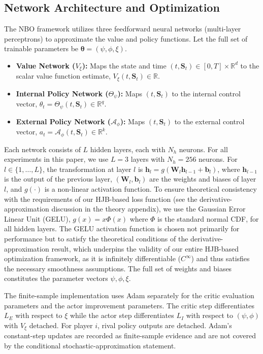 \documentclass[ecta]{econsocart}
\theoremstyle{plain}
\theoremstyle{remark}
\newcommand{\statevec}{\bm{S}}
\newcommand{\paramvec}{\bm{\theta}}
\begin{document}
\subsection{Network Architecture and Optimization}
The NBO framework utilizes three feedforward neural networks (multi-layer perceptrons) to approximate the value and policy functions. Let the full set of trainable parameters be $\paramvec = (\psi, \phi, \xi)$.
\begin{itemize}
    \item \textbf{Value Network ($V_\xi$):} Maps the state and time $(t, \statevec_t) \in [0,T] \times \mathbb{R}^d$ to the scalar value function estimate, $V_\xi(t, \statevec_t) \in \mathbb{R}$.
    \item \textbf{Internal Policy Network ($\Theta_\psi$):} Maps $(t, \statevec_t)$ to the internal control vector, $\theta_t = \Theta_\psi(t, \statevec_t) \in \mathbb{R}^q$.
    \item \textbf{External Policy Network ($\mathcal{A}_\phi$):} Maps $(t, \statevec_t)$ to the external control vector, $a_t = \mathcal{A}_\phi(t, \statevec_t) \in \mathbb{R}^k$.
\end{itemize}
Each network consists of $L$ hidden layers, each with $N_h$ neurons. For all experiments in this paper, we use $L=3$ layers with $N_h=256$ neurons. For $l \in \{1, \dots, L\}$, the transformation at layer $l$ is $\bm{h}_l = g(\bm{W}_l \bm{h}_{l-1} + \bm{b}_l)$, where $\bm{h}_{l-1}$ is the output of the previous layer, $(\bm{W}_l, \bm{b}_l)$ are the weights and biases of layer $l$, and $g(\cdot)$ is a non-linear activation function. To ensure theoretical consistency with the requirements of our HJB-based loss function (see the derivative-approximation discussion in the theory appendix), we use the Gaussian Error Linear Unit (GELU), $g(x) = x \Phi(x)$ where $\Phi$ is the standard normal CDF, for all hidden layers. The GELU activation function is chosen not primarily for performance but to satisfy the theoretical conditions of the derivative-approximation result, which underpins the validity of our entire HJB-based optimization framework, as it is infinitely differentiable ($C^\infty$) and thus satisfies the necessary smoothness assumptions. The full set of weights and biases constitutes the parameter vectors $\psi, \phi, \xi$.

The finite-sample implementation uses Adam separately for the critic evaluation parameters and the actor improvement parameters. The critic step differentiates $L_E$ with respect to $\xi$ while the actor step differentiates $L_I$ with respect to $(\psi,\phi)$ with $V_\xi$ detached. For player $i$, rival policy outputs are detached. Adam's constant-step updates are recorded as finite-sample evidence and are not covered by the conditional stochastic-approximation statement.
\end{document}
